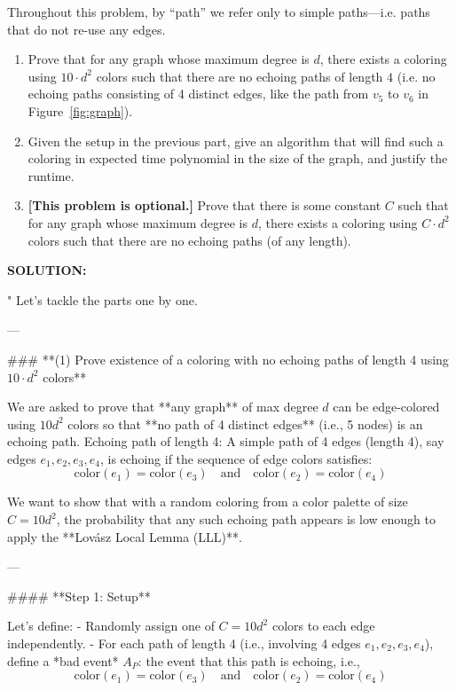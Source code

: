 \begin{enumerate}
Throughout this problem, by ``path'' we refer only to simple paths---i.e. paths that do not re-use any edges.

\begin{enumerate}
\item {} Prove that for any graph whose maximum degree is $d$, there exists a coloring using $10 \cdot d^2$ colors such that there are no echoing paths of length $4$ (i.e. no echoing paths consisting of 4 distinct edges, like the path from $v_5$ to $v_6$ in Figure~\ref{fig:graph}). 


 \item {} Given the setup in the previous part, give an algorithm that will find such a coloring in expected time polynomial in the size of the graph, and justify the runtime.  
\item {} \textbf{[This problem is optional.]}  Prove that there is some constant $C$ such that for any graph whose maximum degree is $d$, there exists a coloring using $C \cdot d^2$ colors such that there are no echoing paths (of any length).
\end{enumerate}


\ifdefined\template
\begin{shaded}
\textbf{SOLUTION:}
\ifdefined\sol


"
Let's tackle the parts one by one.

---

### **(1) Prove existence of a coloring with no echoing paths of length 4 using \(10 \cdot d^2\) colors**

We are asked to prove that **any graph** of max degree \(d\) can be edge-colored using \(10d^2\) colors so that **no path of 4 distinct edges** (i.e., 5 nodes) is an echoing path.  
Echoing path of length 4: A simple path of 4 edges (length 4), say edges \(e_1, e_2, e_3, e_4\), is echoing if the sequence of edge colors satisfies:
\[
\text{color}(e_1) = \text{color}(e_3) \quad \text{and} \quad \text{color}(e_2) = \text{color}(e_4)
\]

We want to show that with a random coloring from a color palette of size \(C = 10d^2\), the probability that any such echoing path appears is low enough to apply the **Lovász Local Lemma (LLL)**.

---

#### **Step 1: Setup**

Let's define:
- Randomly assign one of \(C = 10d^2\) colors to each edge independently.
- For each path of length 4 (i.e., involving 4 edges \(e_1, e_2, e_3, e_4\)), define a *bad event* \(A_P\): the event that this path is echoing, i.e.,
\[
\text{color}(e_1) = \text{color}(e_3) \quad \text{and} \quad \text{color}(e_2) = \text{color}(e_4)
\]


\end{shaded}
\end{enumerate}
